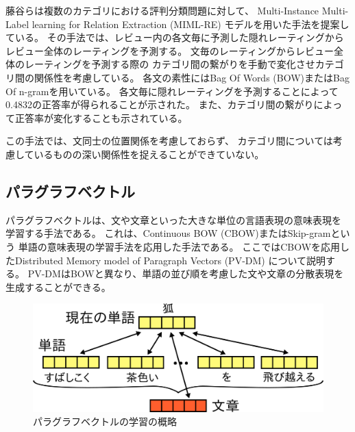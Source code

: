 \documentclass{ttithesis}
\begin{document}
藤谷ら\cite{fujitani15}は複数のカテゴリにおける評判分類問題に対して、
Multi-Instance Multi-Label learning for Relation Extraction (MIML-RE)
\cite{mihai12}モデルを用いた手法を提案している。
その手法では、レビュー内の各文毎に予測した隠れレーティングから
レビュー全体のレーティングを予測する。
文毎のレーティングからレビュー全体のレーティングを予測する際の
カテゴリ間の繋がりを手動で変化させカテゴリ間の関係性を考慮している。
各文の素性にはBag Of Words (BOW)またはBag Of n-gramを用いている。
各文毎に隠れレーティングを予測することによって
0.4832の正答率が得られることが示された。
また、カテゴリ間の繋がりによって正答率が変化することも示されている。

この手法では、文同士の位置関係を考慮しておらず、
カテゴリ間については考慮しているものの深い関係性を捉えることができていない。


\subsection{パラグラフベクトル}

パラグラフベクトルは、文や文章といった大きな単位の言語表現の意味表現を
学習する手法である。
これは、Continuous BOW (CBOW)またはSkip-gram\cite{yoshua03}という
単語の意味表現の学習手法を応用した手法である。
ここではCBOWを応用したDistributed Memory model of Paragraph Vectors (PV-DM)
について説明する。
PV-DMはBOWと異なり、単語の並び順を考慮した文や文章の分散表現を
生成することができる。

\begin{figure}[t!]
  \includegraphics{fig/paragraph_vector.png}
  \caption{パラグラフベクトルの学習の概略}
  \label{fig:ParagraphVector}
\end{figure}
\end{document}
